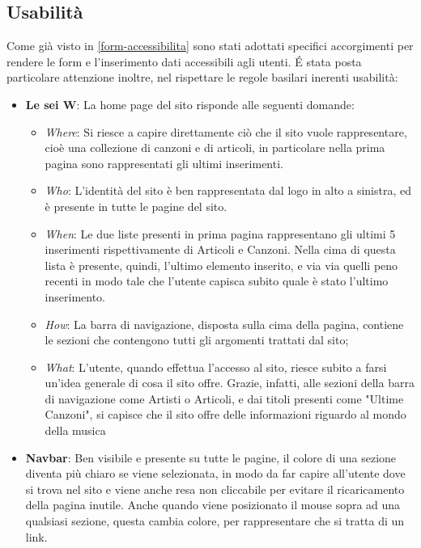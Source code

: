 \subsection{Usabilità}
\label{form-usabilita}
Come già visto in \ref{form-accessibilita} sono stati adottati specifici accorgimenti per rendere le form e l'inserimento dati accessibili agli utenti. \'E stata posta particolare attenzione inoltre, nel rispettare le regole basilari inerenti usabilit\`a: %

\begin{itemize}
    \item \textbf{Le sei W}: La home page del sito risponde alle seguenti domande:
        \begin{itemize}
            \item \emph{Where}: Si riesce a capire direttamente ci\`o che il sito vuole rappresentare, cio\`e una collezione di canzoni e di articoli, in particolare nella prima pagina sono rappresentati gli ultimi inserimenti.
            \item \emph{Who}: L'identit\`a del sito \`e ben rappresentata dal logo in alto a sinistra, ed \`e presente in tutte le pagine del sito.
            \item \emph{When}: Le due liste presenti in prima pagina rappresentano gli ultimi 5 inserimenti rispettivamente di Articoli e Canzoni. Nella cima di questa lista \`e presente, quindi, l'ultimo elemento inserito, e via via quelli peno recenti in modo tale che l'utente capisca subito quale \`e stato l'ultimo inserimento.
            \item \emph{How}: La barra di navigazione, disposta sulla cima della pagina, contiene le sezioni che contengono tutti gli argomenti trattati dal sito;
            \item \emph{What}: L'utente, quando effettua l'accesso al sito, riesce subito a farsi un'idea generale di cosa il sito offre. Grazie, infatti, alle sezioni della barra di navigazione come Artisti o Articoli, e dai titoli presenti come "Ultime Canzoni", si capisce che il sito offre delle informazioni riguardo al mondo della musica
        \end{itemize}

    \item \textbf{Navbar}: Ben visibile e presente su tutte le pagine, il colore di una sezione diventa pi\`u chiaro se viene selezionata, in modo da far capire all'utente dove si trova nel sito e viene anche resa non cliccabile per evitare il ricaricamento della pagina inutile. Anche quando viene posizionato il mouse sopra ad una qualsiasi sezione, questa cambia colore, per rappresentare che si tratta di un link.


\end{itemize}
